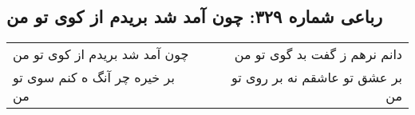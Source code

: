\begin{center}
\section*{رباعی شماره ۳۲۹: چون آمد شد بریدم از کوی تو من}
\label{sec:sh329}
\begin{longtable}{l p{0.5cm} r}
چون آمد شد بریدم از کوی تو من
&&
دانم نرهم ز گفت بد گوی تو من
\\
بر خیره چر آنگ ه کنم سوی تو من
&&
بر عشق تو عاشقم نه بر روی تو من
\\
\end{longtable}
\end{center}
